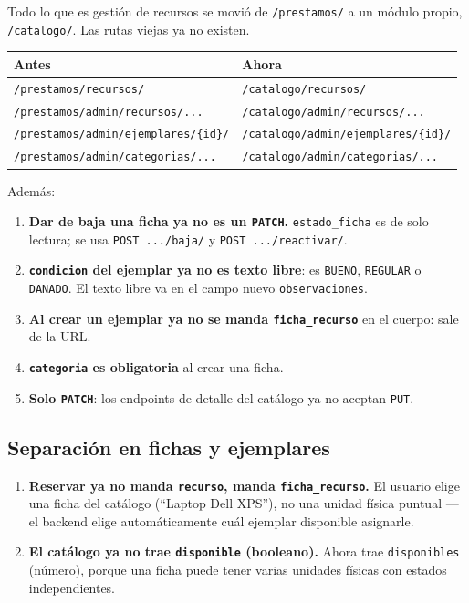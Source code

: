 \documentclass[11pt]{article}
\newcommand{\us}{\_\allowbreak}
\begin{document}
Todo lo que es gesti\'on de recursos se movi\'o de \texttt{/prestamos/} a un m\'odulo propio, \texttt{/catalogo/}. Las rutas viejas ya no existen.

\begin{longtable}{p{7cm}p{8cm}}
\textbf{Antes} & \textbf{Ahora} \\
\hline
\endhead
\texttt{/prestamos/recursos/} & \texttt{/catalogo/recursos/} \\
\texttt{/prestamos/admin/recursos/...} & \texttt{/catalogo/admin/recursos/...} \\
\texttt{/prestamos/admin/ejemplares/\{id\}/} & \texttt{/catalogo/admin/ejemplares/\{id\}/} \\
\texttt{/prestamos/admin/categorias/...} & \texttt{/catalogo/admin/categorias/...} \\
\end{longtable}

Adem\'as:
\begin{enumerate}
    \item \textbf{Dar de baja una ficha ya no es un \texttt{PATCH}.} \texttt{estado\us ficha} es de solo lectura; se usa \texttt{POST .../baja/} y \texttt{POST .../reactivar/}.
    \item \textbf{\texttt{condicion} del ejemplar ya no es texto libre}: es \texttt{BUENO}, \texttt{REGULAR} o \texttt{DANADO}. El texto libre va en el campo nuevo \texttt{observaciones}.
    \item \textbf{Al crear un ejemplar ya no se manda \texttt{ficha\us recurso}} en el cuerpo: sale de la URL.
    \item \textbf{\texttt{categoria} es obligatoria} al crear una ficha.
    \item \textbf{Solo \texttt{PATCH}}: los endpoints de detalle del cat\'alogo ya no aceptan \texttt{PUT}.
\end{enumerate}

\subsection*{Separaci\'on en fichas y ejemplares}

\begin{enumerate}
    \item \textbf{Reservar ya no manda \texttt{recurso}, manda \texttt{ficha\us recurso}.} El usuario elige una ficha del cat\'alogo (\textquotedblleft Laptop Dell XPS\textquotedblright), no una unidad f\'isica puntual --- el backend elige autom\'aticamente cu\'al ejemplar disponible asignarle.
    \item \textbf{El cat\'alogo ya no trae \texttt{disponible} (booleano).} Ahora trae \texttt{disponibles} (n\'umero), porque una ficha puede tener varias unidades f\'isicas con estados independientes.
\end{enumerate}
\end{document}
